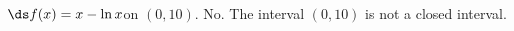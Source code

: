 {$\ds f(x) = x-\ln x$\quad  on \quad $(0,10)$.
}
{No.  The interval $(0,10)$ is not a closed interval.
}
